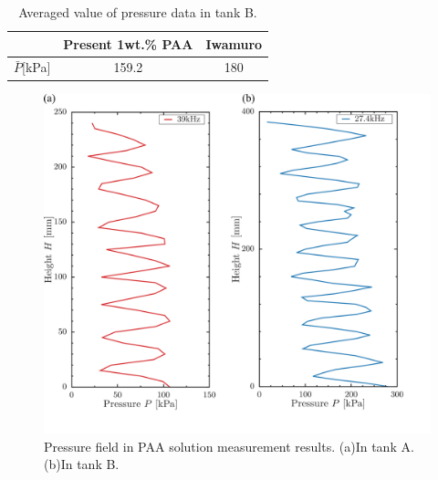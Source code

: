 \begin{table}[h]
    \centering
    \caption{Averaged value of pressure data in tank B.}
    \label{table:press-B}
    \begin{tabular}{c|c|c}\hline
                       & Present 1wt.\% PAA & Iwamuro \cite{ref:9} \\ \hline
        $\bar{P}$[kPa] & 159.2              & 180                              \\ \hline
    \end{tabular}
\end{table}

\begin{figure}[ht]
    \centering
    \includegraphics[width=12cm,clip]{4-Results/press.png}
    \caption{Pressure field in PAA solution measurement results. (a)In tank A. (b)In tank B.}
    \label{fig:pressure}
\end{figure}
